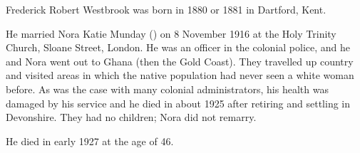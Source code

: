 
Frederick Robert Westbrook was born in 1880 or 1881 in Dartford, Kent.\cite{FrederickWestbrookBirth, FrederickWestbrookDeath} 

He married Nora Katie Munday () on 8 November 1916 at the Holy Trinity Church, Sloane Street, London. \cite{NoraMundayMarriage}  He was an officer in the colonial police, and he and Nora went out to Ghana (then the Gold Coast). They travelled up country and visited areas in which the native population had never seen a white woman before. As was the case with many colonial administrators, his health was damaged by his service and he died in about 1925 after retiring and settling in Devonshire. They had no children; Nora did not remarry.

He died in early 1927 at the age of 46.\cite{FrederickWestbrookDeath}
